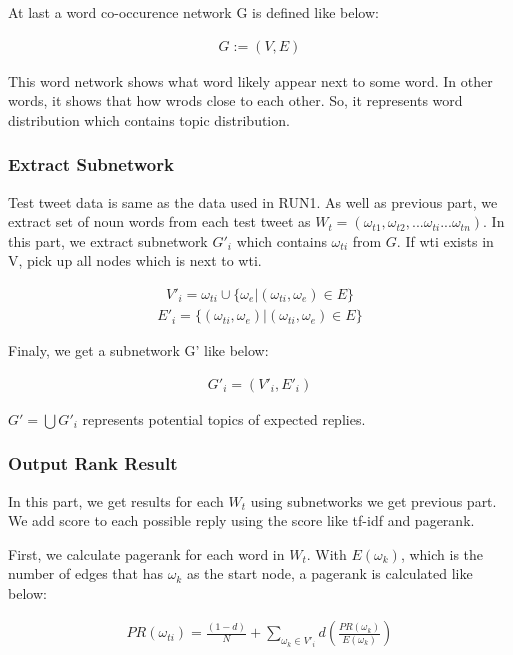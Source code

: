 \documentclass{../style/sig-alternate}
\begin{document}
At last a word co-occurence network G is defined like below:

\begin{eqnarray}
G := (V,E)
\end{eqnarray}

This word network shows what word likely appear next to some word. In other words, it shows that how wrods close to each other. So, it represents word distribution which contains topic distribution.

\subsubsection{Extract Subnetwork}
Test tweet data is same as the data used in RUN1. As well as previous part, we extract set of noun words from each test tweet as \(W_{t} = (\omega_{t1}, \omega_{t2}, ... \omega_{ti} ... \omega_{tn})\).
In this part, we extract subnetwork $G'_{i}$ which contains \(\omega_{ti}\) from $G$.
If wti exists in V, pick up all nodes which is next to wti.

\begin{eqnarray}V'_{i} = \omega_{ti} \cup \{\omega_{e} |  (\omega_{ti}, \omega_{e}) \in E\}\end{eqnarray}
\begin{eqnarray}E'_{i} = \{(\omega_{ti}, \omega_{e}) | (\omega_{ti}, \omega_{e}) \in E\} \end{eqnarray}

Finaly, we get a subnetwork G' like below:

\begin{eqnarray}G'_{i} = (V'_{i}, E'_{i})\end{eqnarray}

\(G' = \bigcup G'_{i}\) represents potential topics of expected replies.

\subsubsection{Output Rank Result}
In this part, we get results for each $W_{t}$ using subnetworks we get previous part. We add score to each possible reply using the score like tf-idf and pagerank\cite{pagerank}.

First, we calculate pagerank for each word in $W_{t}$. With $E(\omega_{k})$, which is the number of edges that has $\omega_{k}$ as the start node, a pagerank is calculated like below:

\begin{eqnarray}PR(\omega_{ti}) = \frac{(1-d)}{N} + \sum_{\omega_{k}\in V'_{i}} d(\frac{PR(\omega_{k})}{E(\omega_{k})})\end{eqnarray}
\end{document}
